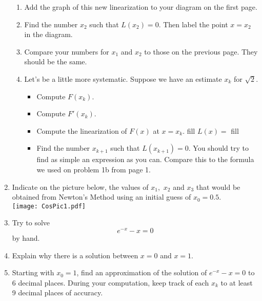 \documentclass[11pt,fleqn]{article}
\begin{document}
\begin{enumerate}
\begin{enumerate}
	\item Add the graph of this new linearization to your diagram
on the first page.
	\item Find the number $x_2$ such that $L(x_2)=0$.  Then label the point $x=x_2$ in the diagram.
\vfill
	\item Compare your numbers for $x_1$ and $x_2$ to those on the previous page. They should be the same.
	\newpage
	\item Let's be a little more systematic.  Suppose we have an estimate
$x_k$ for $\sqrt{2}$.
\begin{itemize}
	\item Compute $F(x_k)$.
	\item Compute $F'(x_k)$.
	\item Compute the linearization of $F(x)$ at $x=x_k$.
	 fill
	$L(x)=$
	 fill
	\item Find the number $x_{k+1}$ such that $L(x_{k+1})=0$.  You
	should try to find as simple an expression as you can. Compare this to the formula we used on problem 1b from page 1. 
	\vfill
\end{itemize}
\end{enumerate}
\item Indicate on the picture below, the values of $x_1,$ $x_2$ and $x_3$ that would be obtained from Newton's Method using an initial guess of $x_0=0.5.$\\
\texttt{[image: CosPic1.pdf]}
\newpage	
\item  Try to solve
\[
e^{-x} - x =0
\]
by hand.  
\vskip 2cm
\item  Explain why there is a solution between $x=0$ and $x=1$.
\vskip 4cm
\item Starting with $x_0=1$, find an approximation of the solution 
of $e^{-x}-x=0$ to 6 decimal places.  During your computation, keep
track of each $x_k$ to at least 9 decimal places of accuracy.
\vfill
\end{enumerate}
\end{document}
